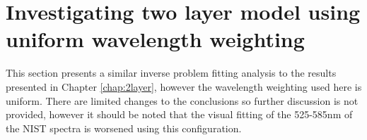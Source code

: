 \section{Investigating two layer model using uniform wavelength weighting}\label{ap:2layeruniform}
This section presents a similar inverse problem fitting analysis to the results presented in Chapter \ref{chap:2layer}, however the wavelength weighting used here is uniform. There are limited changes to the conclusions so further discussion is not provided, however it should be noted that the visual fitting of the 525-585nm of the NIST spectra is worsened using this configuration.

